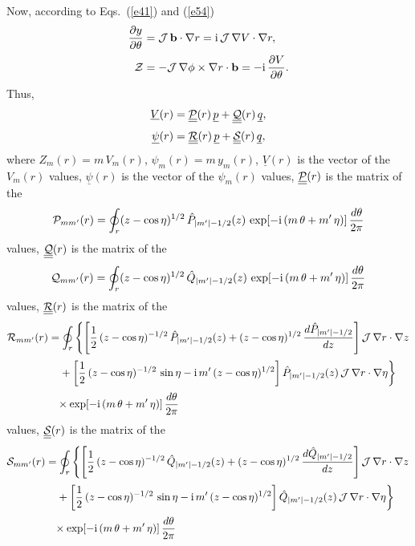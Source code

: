 \documentclass[12pt,prb,aps,notitlepage]{revtex4-1}
\begin{document}
Now, according to Eqs.~(\ref{e41}) and (\ref{e54})
\begin{align}\label{e30ay}
\frac{\partial y}{\partial \theta}&= {\cal J}\,{\bf b}\cdot\nabla r = {\rm i}\,{\cal J}\,\nabla V\cdot\nabla r,\\[0.5ex]
{\cal Z}&= -{\cal J}\,\nabla\phi\times\nabla r \cdot{\bf b} = - {\rm i}\,\frac{\partial V}{\partial\theta}.\label{e31ay}
\end{align}
Thus, 
\begin{align}\label{e32ay}
\underline{V}(r)&= \underline{\underline{{\cal P}}}(r)\,\underline{p}+ \underline{\underline{{\cal Q}}}(r)\,\underline{q},\\[0.5ex]
\underline{\psi}(r)&= \underline{\underline{{\cal R}}}(r)\,\underline{p}+ \underline{\underline{{\cal S}}}(r)\,\underline{q},\label{e33ay}
\end{align}
where $Z_m(r)=m\,V_m(r)$, $\psi_m(r)=m\,y_m(r)$, 
 $\underline{V}(r)$ is the vector of the $V_m(r)$ values, $\underline{\psi}(r)$ is the vector of the $\psi_m(r)$ values, $\underline{\underline{{\cal P}}}(r)$ is the
matrix of the
\begin{equation}
{\cal P}_{mm'}(r)=\oint_{r}(z-\cos\eta)^{1/2}\,\hat{P}_{|m'|-1/2}(z)\,\exp[-{\rm i}\,(m\,\theta+m'\,\eta)]\,\frac{d\theta}{2\pi}
\end{equation}
values, 
$\underline{\underline{{\cal Q}}}(r)$ is the
matrix of the
\begin{equation}
{\cal Q}_{mm'}(r)=\oint_{r}(z-\cos\eta)^{1/2}\,\hat{Q}_{|m'|-1/2}(z)\,\exp[-{\rm i}\,(m\,\theta+m'\,\eta)]\,\frac{d\theta}{2\pi}
\end{equation}
values, $\underline{\underline{{\cal R}}}(r)$ is the matrix of the 
\begin{align}\label{e354}
{\cal R}_{mm'}(r) &=\oint_{r}
\left\{\left[\frac{1}{2}\,(z-\cos\eta)^{-1/2}\,\hat{P}_{|m'|-1/2}(z)+(z-\cos\eta)^{1/2}\,\frac{d\hat{P}_{|m'|-1/2}}{dz}\right]{\cal J}\,\nabla r\cdot \nabla z
\right.\nonumber\\[0.5ex]&
\left.\phantom{=}+\left[\frac{1}{2}\,(z-\cos\eta)^{-1/2}\,\sin\eta-{\rm i}\,m'\,(z-\cos\eta)^{1/2}\right]\hat{P}_{|m'|-1/2}(z)\,{\cal J}\,\nabla r\cdot \nabla \eta
\right\}\nonumber\\[0.5ex] &
\phantom{=}\times\exp[-{\rm i}\,(m\,\theta+m'\,\eta)]\,\frac{d\theta}{2\pi}
\end{align}
values, 
$\underline{\underline{{\cal S}}}(r)$ is the matrix of the 
\begin{align}\label{e355}
{\cal S}_{mm'}(r) &=\oint_{r}
\left\{\left[\frac{1}{2}\,(z-\cos\eta)^{-1/2}\,\hat{Q}_{|m'|-1/2}(z)+(z-\cos\eta)^{1/2}\,\frac{d\hat{Q}_{|m'|-1/2}}{dz}\right]{\cal J}\,\nabla r\cdot \nabla z
\right.\nonumber\\[0.5ex]&
\left.\phantom{=}+\left[\frac{1}{2}\,(z-\cos\eta)^{-1/2}\,\sin\eta-{\rm i}\,m'\,(z-\cos\eta)^{1/2}\right]\hat{Q}_{|m'|-1/2}(z)\,{\cal J}\,\nabla r\cdot \nabla \eta
\right\}\nonumber\\[0.5ex] &
\phantom{=}\times\exp[-{\rm i}\,(m\,\theta+m'\,\eta)]\,\frac{d\theta}{2\pi}
\end{align}
\end{document}
